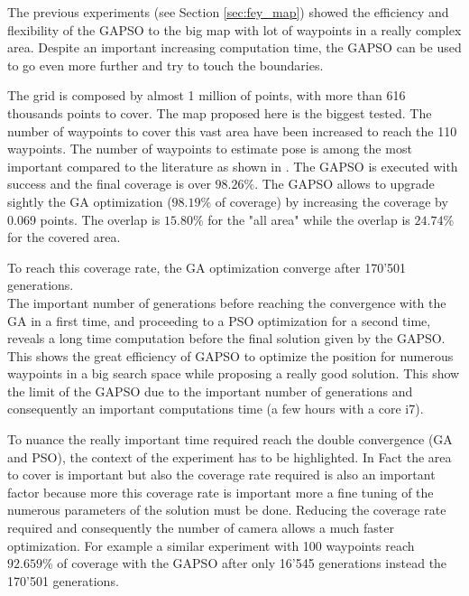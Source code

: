 The previous experiments (see Section \ref{sec:fey_map}) showed the efficiency and flexibility of the GAPSO to the big map with lot of waypoints in a really complex area. Despite an important increasing computation time, the GAPSO can be used to go even more further and try to touch the boundaries.  

The grid is composed by almost 1 million of points, with more than 616 thousands points to cover. The map proposed here is the biggest tested. The number of waypoints to cover this vast area have been increased to reach the 110 waypoints. 
The number of waypoints to estimate pose is among the most important compared to the literature as shown in \citep{8*zhou2011,33*reddy2012,82*chrysostomou2012,143*maji2015, 151*zhao2013, 152*wang2009, 165*jiang2010, 193*fu2014, 181*wang2017, 18*ding2012}. %
The GAPSO is executed with success and the final coverage is over $98.26\%$. The GAPSO allows to upgrade sightly the GA optimization ($98.19\%$ of coverage) by increasing the coverage by  0.069 points. The overlap is $15.80\%$ for the "all area" while the overlap is   $24.74\%$ for the covered area.
	
	 To reach this coverage rate, the GA optimization converge after 170'501 generations. \\
	 The important number of generations before reaching the convergence with the GA in a first time, and  proceeding to a PSO optimization for a second time, reveals a long time computation before the final solution given by the GAPSO. 
	 This shows the great efficiency of GAPSO to optimize the position for numerous waypoints in a big search space while proposing a really good solution. %
	 	This show the limit of the GAPSO due to the important number of generations and consequently an important computations time  (a few hours with a core i7).  

	 To nuance the really important time required reach the double convergence (GA and PSO), the context of the experiment has to be highlighted. In Fact the area to cover is important but also the coverage rate required is also an important factor because more this coverage rate is important more a fine tuning of the numerous parameters of the solution must be done. 
	 Reducing the coverage rate required and consequently the number of camera  allows a much faster optimization. For example a similar experiment with  100 waypoints reach $92.659\%$ of coverage with the GAPSO after only 16'545 generations instead the 170'501 generations. 
	
